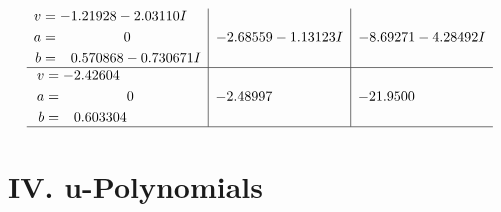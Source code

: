 \documentclass[1p]{elsarticle_modified}
\theoremstyle{definition}
\begin{document}
$$\begin{array}{c|c|c}
\begin{aligned}
v &= -1.21928 - 2.03110 I \\
a &= \phantom{-0.000000 } 0 \\
b &= \phantom{-}0.570868 - 0.730671 I\end{aligned}
 & -2.68559 - 1.13123 I & -8.69271 - 4.28492 I \\ \hline\begin{aligned}
v &= -2.42604\phantom{ +0.000000I} \\
a &= \phantom{-0.000000 } 0 \\
b &= \phantom{-}0.603304\phantom{ +0.000000I}\end{aligned}
 & -2.48997\phantom{ +0.000000I} & -21.9500\phantom{ +0.000000I}\\
 \hline 
 \end{array}$$\newpage
\newpage\renewcommand{\arraystretch}{1}
\centering \section*{ IV. u-Polynomials}
\end{document}
